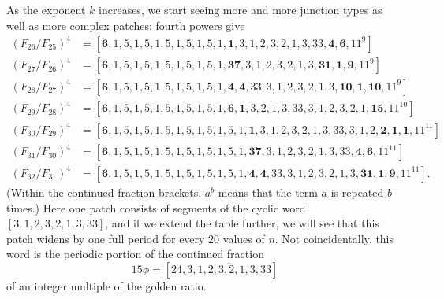 \documentclass{article}
\numberwithin{equation}{section}
\theoremstyle{definition}
\theoremstyle{remark}
\newcommand{\<}{\left\langle}
\renewcommand{\>}{\right\rangle}
\begin{document}
As the exponent $k$ increases, we start seeing more and more junction types as well as more complex patches: fourth powers give
\begin{equation}\label{eq:fib_4}
  \begin{aligned}
    (F_{26}/F_{25})^4 &= [\mathbf{6},1,5,1,5,1,5,1,5,1,5,1,\mathbf{1},3,1,2,3,2,1,3,33,\mathbf{4},\mathbf{6},11^9] \\
    (F_{27}/F_{26})^4 &= [\mathbf{6},1,5,1,5,1,5,1,5,1,5,1,\mathbf{37},3,1,2,3,2,1,3,\mathbf{31},\mathbf{1},\mathbf{9},11^9] \\
    (F_{28}/F_{27})^4 &= [\mathbf{6},1,5,1,5,1,5,1,5,1,5,1,\mathbf{4},\mathbf{4},33,3,1,2,3,2,1,3,\mathbf{10},\mathbf{1},\mathbf{10},11^9] \\
    (F_{29}/F_{28})^4 &= [\mathbf{6},1,5,1,5,1,5,1,5,1,5,1,\mathbf{6},\mathbf{1},3,2,1,3,33,3,1,2,3,2,1,\mathbf{15},11^{10}] \\
    (F_{30}/F_{29})^4 &= [\mathbf{6},1,5,1,5,1,5,1,5,1,5,1,5,1,\mathbf{1},3,1,2,3,2,1,3,33,3,1,2,\mathbf{2},\mathbf{1},\mathbf{1},11^{11}] \\
    (F_{31}/F_{30})^4 &= [\mathbf{6},1,5,1,5,1,5,1,5,1,5,1,5,1,\mathbf{37},3,1,2,3,2,1,3,33,\mathbf{4},\mathbf{6},11^{11}] \\
    (F_{32}/F_{31})^4 &= [\mathbf{6},1,5,1,5,1,5,1,5,1,5,1,5,1,\mathbf{4},\mathbf{4},33,3,1,2,3,2,1,3,\mathbf{31},\mathbf{1},\mathbf{9},11^{11}].
  \end{aligned}
\end{equation}
(Within the continued-fraction brackets, $a^b$ means that the term $a$ is repeated $b$ times.)  Here one patch consists of segments of the cyclic word $[3, 1, 2, 3, 2, 1, 3, 33]$, and if we extend the table further, we will see that this patch widens by one full period for every $20$ values of $n$. Not coincidentally, this word is the periodic portion of the continued fraction
\begin{equation}
  15 \phi = [24, \overline{3, 1, 2, 3, 2, 1, 3, 33}]
\end{equation}
of an integer multiple of the golden ratio.
\end{document}
